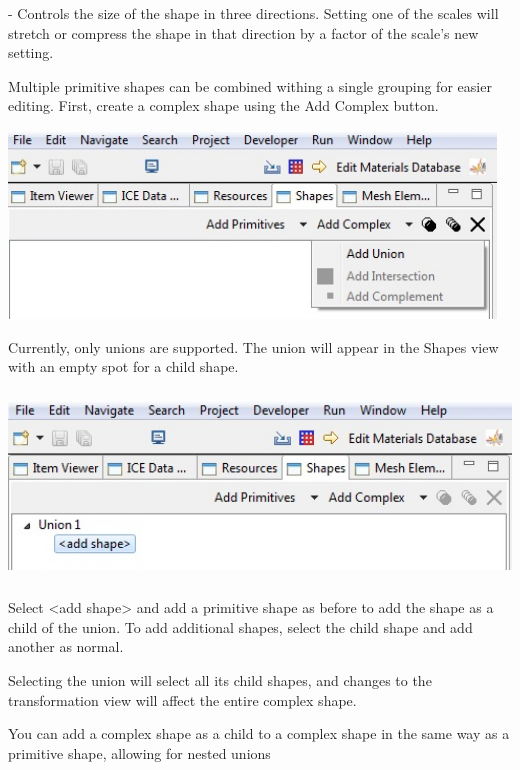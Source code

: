 \documentclass{article}
\begin{document}
 - Controls the size of the shape in three directions. Setting one
of the scales will stretch or compress the shape in that direction by a factor
of the scale's new setting.


Multiple primitive shapes can be combined withing a single grouping for easier
editing. First, create a complex shape using the Add Complex button. 

\begin{center}
\includegraphics[height=5cm]{images/GeometryAddComplex.jpg}
\end{center}

Currently, only unions are supported. The union will appear in the Shapes view
with an empty spot for a child shape. 

\begin{center}
\includegraphics[height=5cm]{images/GeometryUnionAddShape.jpg}
\end{center}

Select <add shape> and add a primitive shape as before to add the shape as a
child of the union. To add additional shapes, select the child shape and add
another as normal.

Selecting the union will select all its child shapes, and changes to the
transformation view will affect the entire complex shape. 

You can add a complex shape as a child to a complex shape in the same way as a
primitive shape, allowing for nested unions
\end{document}
